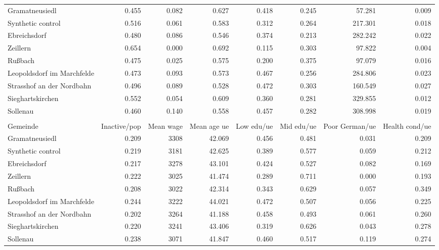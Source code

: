 \begin{tabular}{lrrrrrrr}
\midrule
Gramatneusiedl & 0.455 & 0.082 & 0.627 & 0.418 & 0.245 & 57.281 & 0.009\\
Synthetic control & 0.516 & 0.061 & 0.583 & 0.312 & 0.264 & 217.301 & 0.018\\
\addlinespace
Ebreichsdorf & 0.480 & 0.086 & 0.546 & 0.374 & 0.213 & 282.242 & 0.022\\
Zeillern & 0.654 & 0.000 & 0.692 & 0.115 & 0.303 & 97.822 & 0.004\\
Rußbach & 0.475 & 0.025 & 0.575 & 0.200 & 0.375 & 97.079 & 0.016\\
Leopoldsdorf im Marchfelde & 0.473 & 0.093 & 0.573 & 0.467 & 0.256 & 284.806 & 0.023\\
Strasshof an der Nordbahn & 0.496 & 0.089 & 0.528 & 0.472 & 0.303 & 160.549 & 0.027\\
Sieghartskirchen & 0.552 & 0.054 & 0.609 & 0.360 & 0.281 & 329.855 & 0.012\\
Sollenau & 0.460 & 0.140 & 0.558 & 0.457 & 0.282 & 308.998 & 0.019\\
\bottomrule
\addlinespace\multicolumn{8}{c}{\textbf{2020}}\\\addlinespace\toprule
Gemeinde & Inactive/pop & Mean wage & Mean age ue & Low edu/ue & Mid edu/ue & Poor German/ue & Health cond/ue\\
\midrule
Gramatneusiedl & 0.209 & 3308 & 42.069 & 0.456 & 0.481 & 0.031 & 0.209\\
Synthetic control & 0.219 & 3181 & 42.625 & 0.389 & 0.577 & 0.059 & 0.212\\
\addlinespace
Ebreichsdorf & 0.217 & 3278 & 43.101 & 0.424 & 0.527 & 0.082 & 0.169\\
Zeillern & 0.222 & 3025 & 41.474 & 0.289 & 0.711 & 0.000 & 0.193\\
Rußbach & 0.208 & 3022 & 42.314 & 0.343 & 0.629 & 0.057 & 0.349\\
Leopoldsdorf im Marchfelde & 0.244 & 3222 & 44.021 & 0.472 & 0.507 & 0.056 & 0.225\\
Strasshof an der Nordbahn & 0.202 & 3264 & 41.188 & 0.458 & 0.493 & 0.061 & 0.260\\
Sieghartskirchen & 0.220 & 3241 & 43.406 & 0.319 & 0.626 & 0.043 & 0.278\\
Sollenau & 0.238 & 3071 & 41.847 & 0.460 & 0.517 & 0.119 & 0.274\\
\bottomrule
\end{tabular}
